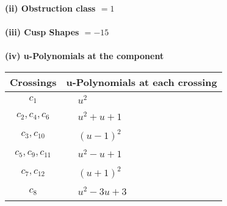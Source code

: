 \documentclass[1p]{elsarticle_modified}
\theoremstyle{definition}
\begin{document}
\flushleft \textbf{(ii) Obstruction class $= 1$}\\~\\
\flushleft \textbf{(iii) Cusp Shapes $= -15$}\\~\\
\newpage\renewcommand{\arraystretch}{1}
\flushleft \textbf{(iv) u-Polynomials at the component}\newline \\
\begin{tabular}{m{50pt}|m{274pt}}
Crossings & \hspace{64pt}u-Polynomials at each crossing \\
\hline $$\begin{aligned}c_{1}\end{aligned}$$&$\begin{aligned}
&u^2
\end{aligned}$\\
\hline $$\begin{aligned}c_{2},c_{4},c_{6}\end{aligned}$$&$\begin{aligned}
&u^2+u+1
\end{aligned}$\\
\hline $$\begin{aligned}c_{3},c_{10}\end{aligned}$$&$\begin{aligned}
&(u-1)^2
\end{aligned}$\\
\hline $$\begin{aligned}c_{5},c_{9},c_{11}\end{aligned}$$&$\begin{aligned}
&u^2- u+1
\end{aligned}$\\
\hline $$\begin{aligned}c_{7},c_{12}\end{aligned}$$&$\begin{aligned}
&(u+1)^2
\end{aligned}$\\
\hline $$\begin{aligned}c_{8}\end{aligned}$$&$\begin{aligned}
&u^2-3 u+3
\end{aligned}$\\
\hline
\end{tabular}\\~\\
\newpage\renewcommand{\arraystretch}{1}
\end{document}
